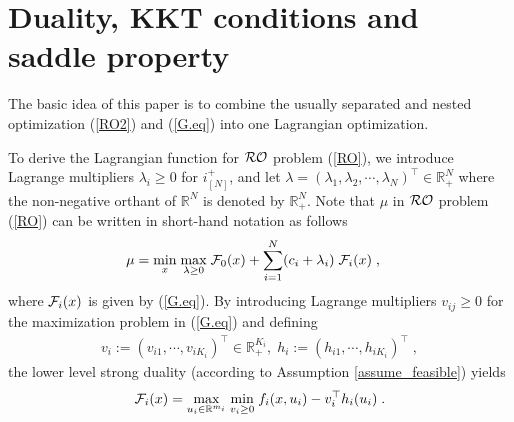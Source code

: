\documentclass[journal,twoside,web]{ieeecolor}
\begin{document}
\section{Duality, KKT conditions and saddle property} \label{section_saddle}
The basic idea of this paper is to combine the usually separated and nested optimization (\ref{RO2}) and (\ref{G.eq}) into one Lagrangian optimization.

To derive the Lagrangian function for ${\cal RO}$ problem (\ref{RO}), we introduce Lagrange multipliers $\lambda_i\geq 0$ for $i^+_{[N]}$, and let $\lambda=(\lambda_1,\lambda_2,\cdots,\lambda_N)^\top \in \mathbb{R}_+^N$ where the non-negative orthant of $\mathbb{R}^N$ is denoted by $\mathbb{R}_+^N$. Note that $\mu$ in ${\cal RO}$ problem (\ref{RO}) can be written in short-hand notation  as follows
\begin{align}
\mu=&\;\underset{x}{\min}\;\underset{\lambda\geq 0}{\max}\; {\cal F}_0(x)+\sum_{i=1}^N (c_i+\lambda_i) \; {\cal F}_i(x)\;,
 \label{upper_ro}
\end{align}
where ${\cal F}_i(x)$ is given by (\ref{G.eq}).
 By introducing Lagrange multipliers $v_{ij} \geq 0$ for the maximization problem in (\ref{G.eq}) and defining
\begin{align*}
v_i:=(v_{i1},\cdots, v_{iK_i})^\top \in \mathbb{R}_+^{K_i},\;h_i:=(h_{i1},\cdots, h_{iK_i})^\top\;,\nonumber
\end{align*}
the lower level strong duality (according to Assumption \ref{assume_feasible}) yields
\begin{align} \label{lower_ro}
{\cal F}_i(x)=\underset{u_i\in \mathbb{R}^{m_i}}{\max}\;\underset{v_{i}\geq 0}{\min}\;f_i(x,u_i)-v_i^\top h_{i}(u_i)\;.
\end{align}
\end{document}
